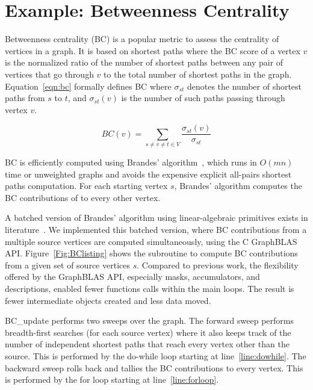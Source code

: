\section{Example: Betweenness Centrality}

\label{sec:example}
Betweenness centrality (BC) is a popular metric to assess the centrality of vertices in a graph. It is based on shortest paths where the BC score
of a vertex $v$ is the normalized ratio of the number of shortest paths between any pair of vertices that go through $v$ to the total number of shortest paths in the graph. 
Equation~\ref{eqn:bc} formally defines BC where $\sigma_{st}$ denotes the number of shortest paths from $s$ to $t$, and $\sigma_{st}(v)$ is the number of such paths 
passing through vertex $v$.

\begin{equation}
	BC(v) = \sum_{s \neq v \neq t \in V} \frac{\sigma_{st}(v)}{\sigma_{st}}
\label{eqn:bc}
\end{equation}

BC is efficiently computed using Brandes' algorithm~\cite{brandes2001faster}, which runs in $O(mn)$ time or unweighted graphs and avoids the expensive explicit all-pairs shortest paths computation.
For each starting vertex $s$, Brandes' algorithm computes the BC contributions of to every other vertex. 

A batched version of Brandes' algorithm using linear-algebraic primitives exists 
in literature~\cite{bader2006designing,robinson2011complex,combblas}. 
We implemented this batched version, where BC contributions from a multiple source vertices are computed simultaneously, 
using the C GraphBLAS API. Figure~\ref{Fig:BClisting} shows the subroutine to compute BC contributions from a given set of source vertices $s$. Compared to previous work, the flexibility offered by the GraphBLAS API, especially masks, accumulators, and descriptions, enabled fewer functions calls within the main loops. The result is fewer intermediate objects 
created and less data moved. 

BC\_update performs two sweeps over the graph. The forward sweep performs breadth-first searches (for each source vertex) where it also keeps track of the number
of independent shortest paths that reach every vertex other than the source. This is performed by the do-while loop starting at line~\ref{line:dowhile}. 
The backward sweep rolls back and tallies the BC contributions to every vertex. This is performed by the for loop starting at line~\ref{line:forloop}.


